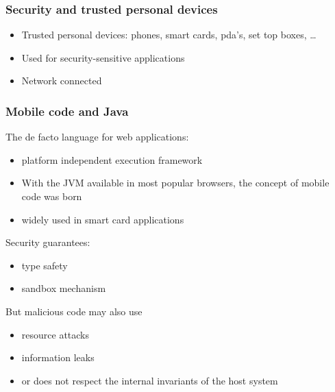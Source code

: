 \documentclass{beamer}
\begin{document}

\begin{frame}
\frametitle{Security and trusted personal devices}
\begin{itemize}
\item Trusted personal devices: phones, smart cards, pda's, set
top boxes, \dots
\item Used for security-sensitive applications
\item Network connected
\end{itemize}
\end{frame}


\begin{frame}\frametitle{Mobile code and Java}
The de facto language for web applications:
 \begin{itemize}
  \item platform independent execution framework
  \item  With the JVM available in most popular browsers, the concept of mobile code was born
  \item widely used in   smart card applications
 \end{itemize}

Security guarantees: 
\begin{itemize}
    \item type safety
     \item sandbox mechanism
\end{itemize}

But malicious code may also use 
\begin{itemize}
     \item resource attacks
       \item information leaks
	 \item or does not respect the internal invariants of the host system
\end{itemize}
\end{frame}
\end{document}

